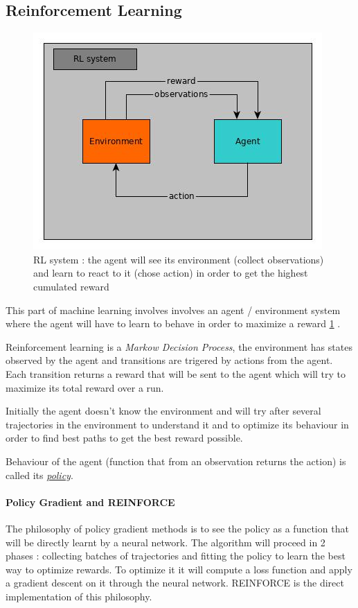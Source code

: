 \documentclass[11pt]{article}
\begin{document}
\subsection{Reinforcement Learning}
\begin{figure}[!h]
\centering
\includegraphics[scale=0.40]{rl.jpg}
\caption{RL system : the agent will see its environment (collect observations) and learn to react to it (chose action) in order to get the highest cumulated reward}
\label{rl}
\end{figure} 
This part of machine learning involves involves an agent / environment system where the agent will have to learn to behave in order to maximize a reward \ref{rl} .

Reinforcement learning is a \emph{Markow Decision Process}, the environment has states observed by the agent and transitions are trigered by actions from the agent. Each transition returns a reward that will be sent to the agent which will try to maximize its total reward over a run.

Initially the agent doesn't know the environment and will try after several trajectories in the environment to understand it and to optimize its behaviour in order to find best paths to get the best reward possible.

Behaviour of the agent (function that from an observation returns the action) is called its \textit{\underline{policy}}.

\paragraph{Policy Gradient and REINFORCE}
The philosophy of policy gradient methods is to see the policy as a function that will be directly learnt by a neural network. The algorithm will proceed in 2 phases : collecting batches of trajectories and fitting the policy to learn the best way to optimize rewards. To optimize it it will compute a loss function and apply a gradient descent on it through the neural network. REINFORCE is the direct implementation of this philosophy.
\end{document}

